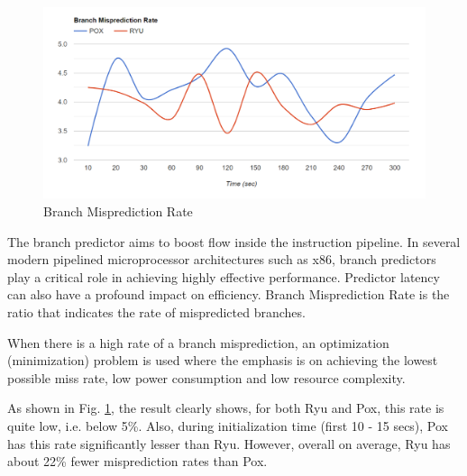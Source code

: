 \begin{figure}[!hbt]
    \centering
        \includegraphics[width=\textwidth,keepaspectratio]{images/branch_mispredicted.png}
       \caption{Branch Misprediction Rate}
        \label{branchmisprediction}
\end{figure}

The branch predictor aims to boost flow inside the instruction pipeline. In several modern pipelined microprocessor architectures such as x86, branch predictors play a critical role in achieving highly effective performance. Predictor latency can also have
a profound impact on efficiency. Branch Misprediction Rate is the ratio that indicates the rate of mispredicted branches.

When there is a high rate of a branch misprediction, an optimization (minimization) problem is used where the
emphasis is on achieving the lowest possible miss rate, low power consumption and low resource complexity. 

As shown in Fig. \ref{branchmisprediction}, the result clearly shows, for both Ryu and Pox, this rate is quite low, i.e. below 5\%. Also, during initialization time (first 10 - 15 secs), Pox has this rate significantly lesser than Ryu. However, overall on average, Ryu has about 22\% fewer misprediction rates than Pox.